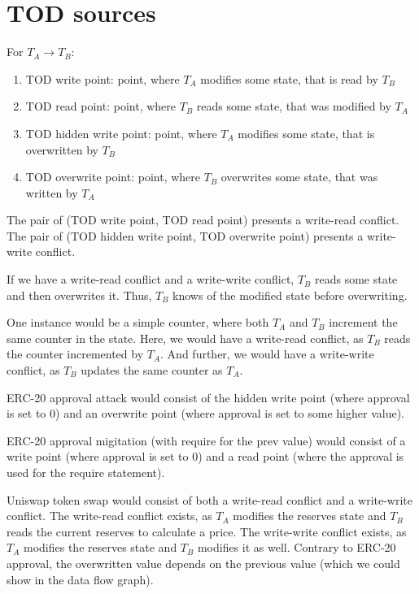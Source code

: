 \documentclass[draft,final]{vutinfth} %
\begin{document}
\section{TOD sources}

For $T_A \rightarrow T_B$:

\begin{enumerate}
    \item TOD write point: point, where $T_A$ modifies some state, that is read by $T_B$
    \item TOD read point: point, where $T_B$ reads some state, that was modified by $T_A$
    \item TOD hidden write point: point, where $T_A$ modifies some state, that is overwritten by $T_B$
    \item TOD overwrite point: point, where $T_B$ overwrites some state, that was written by $T_A$
\end{enumerate}

The pair of (TOD write point, TOD read point) presents a write-read conflict. The pair of (TOD hidden write point, TOD overwrite point) presents a write-write conflict.

If we have a write-read conflict and a write-write conflict, $T_B$ reads some state and then overwrites it. Thus, $T_B$ knows of the modified state before overwriting.

One instance would be a simple counter, where both $T_A$ and $T_B$ increment the same counter in the state. Here, we would have a write-read conflict, as $T_B$ reads the counter incremented by $T_A$. And further, we would have a write-write conflict, as $T_B$ updates the same counter as $T_A$.

ERC-20 approval attack would consist of the hidden write point (where approval is set to 0) and an overwrite point (where approval is set to some higher value).

ERC-20 approval migitation (with require for the prev value) would consist of a write point (where approval is set to 0) and a read point (where the approval is used for the require statement).

Uniswap token swap would consist of both a write-read conflict and a write-write conflict. The write-read conflict exists, as $T_A$ modifies the reserves state and $T_B$ reads the current reserves to calculate a price. The write-write conflict exists, as $T_A$ modifies the reserves state and $T_B$ modifies it as well. Contrary to ERC-20 approval, the overwritten value depends on the previous value (which we could show in the data flow graph).
\end{document}
